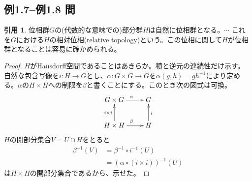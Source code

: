\documentclass[12pt]{jsarticle}
\theoremstyle{definition}%
\newtheorem*{quo}{引用}%
\renewenvironment{leftbar}{%
  \renewcommand\FrameCommand{\vrule width 1pt \hspace{10pt}}%
  \MakeFramed {\advance\hsize-\width \FrameRestore}}%
 {\endMakeFramed}
\newcommand{\barquo}[1]{\begin{leftbar} \begin{quo}  #1 \end{quo} \end{leftbar}}
\newcommand{\bfsubsection}[1]{\subsection*{\textbf{#1}}}
\begin{document}
\bfsubsection{例1.7--例1.8 間}
\barquo{
位相群$G$の(代数的な意味での)部分群$H$は自然に位相群となる。$\cdots$
これを$G$における$H$の相対位相(relative topology)という。この位相に関して$H$が位相群となることは容易に確かめられる。
}
\begin{proof}
$H$がHausdorff空間であることはあきらか。積と逆元の連続性だけ示す。
自然な包含写像を$i \colon H \to G$とし、$\alpha \colon G \times G \to G$を$\alpha(g,h)=gh^{-1}$により定める。$\alpha$の$H \times H$への制限を$\beta$と書くことにする。このとき次の図式は可換。
\[
\xymatrix{ G \times G \ar[r]^{\alpha} & G  \\ H \times H \ar[u]^{i \times i} \ar[r]^{\beta} & H \ar[u]_i }
\]
$H$の開部分集合$V = U \cap H$をとると
\begin{align*}
\beta^{-1}(V) &= \beta^{-1} \circ i^{-1}(U) \\
&= (\alpha \circ (i \times i))^{-1}(U)
\end{align*}
は$H \times H$の開部分集合であるから、示せた。
\end{proof}
\end{document}
